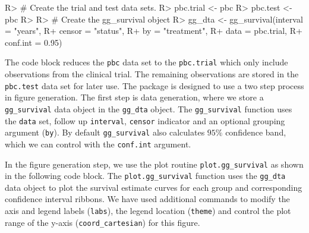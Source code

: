 \documentclass[article]{jss}
\begin{document}
\begin{Schunk}
\begin{Sinput}
R> # Create the trial and test data sets.
R> pbc.trial <- pbc %
R> pbc.test <- pbc %
R> 
R> # Create the gg_survival object
R> gg_dta <- gg_survival(interval = "years",
R+                       censor = "status",
R+                       by = "treatment",
R+                       data = pbc.trial,
R+                       conf.int = 0.95)
\end{Sinput}
\end{Schunk}

The code block reduces the \texttt{pbc} data set to the
\texttt{pbc.trial} which only include observations from the clinical
trial. The remaining observations are stored in the \texttt{pbc.test}
data set for later use. The  package is designed to
use a two step process in figure generation. The first step is data
generation, where we store a \texttt{gg\_survival} data object in the
\texttt{gg\_dta} object. The \texttt{gg\_survival} function uses the
\texttt{data} set, follow up \texttt{interval}, \texttt{censor}
indicator and an optional grouping argument (\texttt{by}). By default
\texttt{gg\_survival} also calculates \(95\%\) confidence band, which we
can control with the \texttt{conf.int} argument.

In the figure generation step, we use the  plot
routine \texttt{plot.gg\_survival} as shown in the following code block.
The \texttt{plot.gg\_survival} function uses the \texttt{gg\_dta} data
object to plot the survival estimate curves for each group and
corresponding confidence interval ribbons. We have used additional
 commands to modify the axis and legend labels
(\texttt{labs}), the legend location (\texttt{theme}) and control the
plot range of the y-axis (\texttt{coord\_cartesian}) for this figure.
\end{document}

